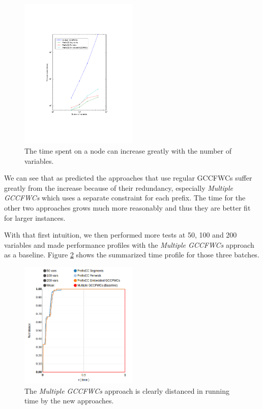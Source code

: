 \documentclass[a4paper,10pt]{article}
\begin{document}
\begin{figure}[h]
    \centering
    \includegraphics[trim = 4cm 6cm 4cm 6cm, width=0.5\textwidth]{img/loglog-graph}
    \caption{The time spent on a node can increase greatly with the number of variables.}
    \label{fig:loglog-complexity}
\end{figure}

We can see that as predicted the approaches that use regular GCCFWCs suffer greatly from the increase because of their redundancy, especially \emph{Multiple GCCFWCs} which uses a separate constraint for each prefix. The time for the other two approaches grows much more reasonably and thus they are better fit for larger instances.

With that first intuition, we then performed more tests at 50, 100 and 200 variables and made performance profiles with the \emph{Multiple GCCFWCs} approach as a baseline. Figure \ref{fig:weak-all-time-static} shows the summarized time profile for those three batches.

\begin{figure}[h]
    \centering
    \includegraphics[width=0.5\textwidth]{img/weak-all-time-static}
    \caption{The \emph{Multiple GCCFWCs} approach is clearly distanced in running time by the new approaches.}
    \label{fig:weak-all-time-static}
\end{figure}
\end{document}
